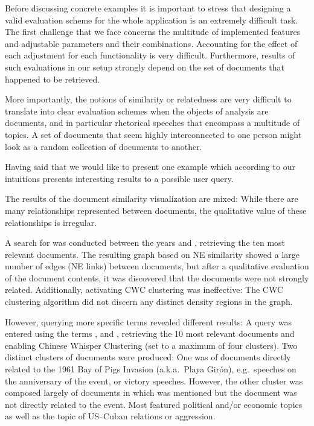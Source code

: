 Before discussing concrete examples it is important to stress that designing a valid evaluation scheme for the whole application is an extremely difficult task. The first challenge that we face concerns the multitude of implemented features and adjustable parameters and their combinations. Accounting for the effect of each adjustment for each functionality is very difficult. Furthermore, results of such evaluations in our setup strongly depend on the set of documents that happened to be retrieved.   

More importantly, the notions of similarity or relatedness are very difficult to translate into clear evaluation schemes when the objects of analysis are documents, and in particular rhetorical speeches that encompass a multitude of topics. A set of documents that seem highly interconnected to one person might look as a random collection of documents to another. 

Having said that we would like to present one example which according to our intuitions presents interesting results to a possible user query.


The results of the document similarity visualization are mixed: While there are many relationships represented between documents, the qualitative value of these relationships is irregular.

A search for  was conducted between the years  and , retrieving the ten most relevant documents. The resulting graph based on NE similarity showed a large number of 
edges (NE links) between documents, but after a qualitative evaluation of the document contents, it was discovered that the documents were not strongly related. Additionally, activating CWC clustering was ineffective: The CWC clustering algorithm did not discern any distinct density regions in the graph.

However, querying more specific terms revealed different results: A query was entered using the terms , and , retrieving the 10 most relevant documents and enabling Chinese Whisper Clustering (set to a maximum of four clusters). Two distinct clusters of documents were produced: One was of documents directly related to the 1961 Bay of Pigs Invasion (a.k.a.\ Playa Gir\'{o}n), e.g.\ speeches on the anniversary of the event, or victory speeches. However, the other cluster was composed largely of documents in which  was mentioned but the document was not directly related to the event. Most featured political and/or economic topics as well as the topic of US--Cuban relations or aggression.

